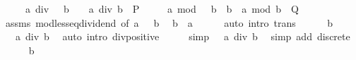 \begin{isabellebody}
\ \ \ {\isachardoublequoteopen}{}\ {\isacharasterisk}{\kern0pt}\ {\isacharparenleft}{\kern0pt}a\ div\ {\isacharparenleft}{\kern0pt}{}\ {\isacharasterisk}{\kern0pt}\ b{\isacharparenright}{\kern0pt}{\isacharparenright}{\kern0pt}\ {\isacharplus}{\kern0pt}\ {}\ {\isacharequal}{\kern0pt}\ a\ div\ b{\isachardoublequoteclose}\ {\isacharparenleft}{\kern0pt}\ {\isachardoublequoteopen}{\isacharquery}{\kern0pt}P{\isachardoublequoteclose}{\isacharparenright}{\kern0pt}\isanewline
\ \ \ \ \ {\isachardoublequoteopen}a\ mod\ {\isacharparenleft}{\kern0pt}{}\ {\isacharasterisk}{\kern0pt}\ b{\isacharparenright}{\kern0pt}\ {\isacharminus}{\kern0pt}\ b\ {\isacharequal}{\kern0pt}\ a\ mod\ b{\isachardoublequoteclose}\ {\isacharparenleft}{\kern0pt}\ {\isachardoublequoteopen}{\isacharquery}{\kern0pt}Q{\isachardoublequoteclose}{\isacharparenright}{\kern0pt}\isanewline
%
\isadelimproof
%
\endisadelimproof
%
\isatagproof
{}\isamarkupfalse%
\ {\isacharminus}{\kern0pt}\isanewline
\ \ \isamarkupfalse%
\ assms\ mod{\isacharunderscore}{\kern0pt}less{\isacharunderscore}{\kern0pt}eq{\isacharunderscore}{\kern0pt}dividend\ {\isacharbrackleft}{\kern0pt}of\ a\ {\isachardoublequoteopen}{}\ {\isacharasterisk}{\kern0pt}\ b{\isachardoublequoteclose}{\isacharbrackright}{\kern0pt}\ \isamarkupfalse%
\ {\isachardoublequoteopen}b\ {\isasymle}\ a{\isachardoublequoteclose}\isanewline
\ \ \ \ \isamarkupfalse%
\ {\isacharparenleft}{\kern0pt}auto\ intro{\isacharcolon}{\kern0pt}\ trans{\isacharparenright}{\kern0pt}\isanewline
\ \ \isamarkupfalse%
\ {\isacartoucheopen}{}\ {\isacharless}{\kern0pt}\ b{\isacartoucheclose}\ \isamarkupfalse%
\ {\isachardoublequoteopen}{}\ {\isacharless}{\kern0pt}\ a\ div\ b{\isachardoublequoteclose}\ \isamarkupfalse%
\ {\isacharparenleft}{\kern0pt}auto\ intro{\isacharcolon}{\kern0pt}\ div{\isacharunderscore}{\kern0pt}positive{\isacharparenright}{\kern0pt}\isanewline
\ \ \isamarkupfalse%
\ \isamarkupfalse%
\ {\isacharbrackleft}{\kern0pt}simp{\isacharbrackright}{\kern0pt}{\isacharcolon}{\kern0pt}\ {\isachardoublequoteopen}{}\ {\isasymle}\ a\ div\ b{\isachardoublequoteclose}\ \isamarkupfalse%
\ {\isacharparenleft}{\kern0pt}simp\ add{\isacharcolon}{\kern0pt}\ discrete{\isacharparenright}{\kern0pt}\isanewline
\ \ \isamarkupfalse%
\ {\isacartoucheopen}{}\ {\isacharless}{\kern0pt}\ b{\isacartoucheclose}\ \isamarkupfalse%

\end{isabellebody}
